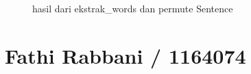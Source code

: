 \begin{enumerate}
\begin{figure}[!htbp]
      \caption{hasil dari ekstrak\_words dan permute Sentence}
      \label{c90}
      \end{figure}

\end{enumerate}


\section{Fathi Rabbani / 1164074}
